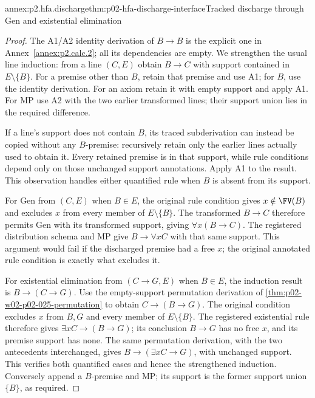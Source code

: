 \begin{annexitem}{annex:p2.hfa.discharge}{thm:p02-hfa-discharge-interface}{Tracked discharge through Gen and existential elimination}
\begin{proof}
The A1/A2 identity derivation of \(B\to B\) is the explicit one
in Annex~\ref{annex:p2.calc.2}; all its dependencies are empty.
We strengthen the usual line induction: from a line \((C,E)\) obtain
\(B\to C\) with support contained in \(E\setminus\{B\}\).
For a premise other than \(B\), retain that premise and use A1;
for \(B\), use the identity derivation. For an axiom retain it
with empty support and apply A1. For MP use A2 with the two earlier
transformed lines; their support union lies in the required difference.

If a line's support does not contain \(B\), its traced subderivation
can instead be copied without any \(B\)-premise: recursively retain
only the earlier lines actually used to obtain it. Every retained
premise is in that support, while rule conditions depend only on those
unchanged support annotations. Apply A1 to the result. This observation
handles either quantified rule when \(B\) is absent from its support.

For Gen from \((C,E)\) when \(B\in E\), the original rule
condition gives \(x\notin\FV(B)\) and excludes \(x\) from
every member of \(E\setminus\{B\}\). The transformed
\(B\to C\) therefore permits Gen with its transformed support,
giving \(\forall x(B\to C)\). The registered distribution schema
and MP give \(B\to\forall xC\) with that same support. This
argument would fail if the discharged premise had a free \(x\);
the original annotated rule condition is exactly what excludes it.

For existential elimination from \((C\to G,E)\) when \(B\in E\),
the induction result is \(B\to(C\to G)\). Use the empty-support
permutation derivation of \cref{thm:p02-w02-p02-025-permutation} to obtain \(C\to(B\to G)\).
The original condition excludes \(x\) from \(B,G\) and every
member of \(E\setminus\{B\}\). The registered existential rule
therefore gives \(\exists xC\to(B\to G)\); its conclusion
\(B\to G\) has no free \(x\), and its premise support has
none. The same permutation derivation, with the two antecedents interchanged, gives
\(B\to(\exists xC\to G)\), with unchanged support. This verifies
both quantified cases and hence the strengthened induction.
Conversely append a \(B\)-premise and MP; its support is the former
support union \(\{B\}\), as required.
\end{proof}
\end{annexitem}

